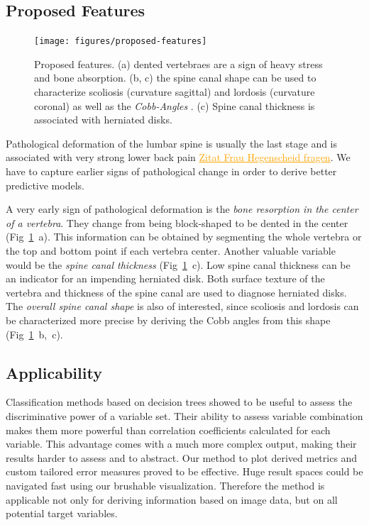 \documentclass[a4paper,twoside]{style/article}
\newcommand{\com}[1]{\textcolor{orange}{\uline{#1}}}
\begin{document}
\subsection{Proposed Features}
\label{sec:ProposedFeatures}
\begin{figure}[!h]
  \centering
  \texttt{[image: figures/proposed-features]}
  \caption{
	Proposed features.
	(a) dented vertebraes are a sign of heavy stress and bone absorption.
	(b, c) the spine canal shape can be used to characterize scoliosis (curvature sagittal) and lordosis (curvature coronal) as well as the \emph{Cobb-Angles} \cite{Cobb}.
	(c) Spine canal thickness is associated with herniated disks.
	}
  \label{fig:proposedFeatures}
\end{figure}
\noindent Pathological deformation of the lumbar spine is usually the last stage and is associated with very strong lower back pain \com{Zitat Frau Hegenscheid fragen}.
We have to capture earlier signs of pathological change in order to derive better predictive models.

A very early sign of pathological deformation is the \emph{bone resorption in the center of a vertebra}.
They change from being block-shaped to be dented in the center (Fig~\ref{fig:proposedFeatures}~a).
This information can be obtained by segmenting the whole vertebra or the top and bottom point if each vertebra center.
Another valuable variable would be the \emph{spine canal thickness} (Fig~\ref{fig:proposedFeatures}~c).
Low spine canal thickness can be an indicator for an impending herniated disk.
Both surface texture of the vertebra and thickness of the spine canal are used to diagnose herniated disks.
The \emph{overall spine canal shape} is also of interested, since scoliosis and lordosis can be characterized more precise by deriving the Cobb angles from this shape (Fig~\ref{fig:proposedFeatures}~b,~c).
\subsection{Applicability}
Classification methods based on decision trees showed to be useful to assess the discriminative power of a variable set.
Their ability to assess variable combination makes them more powerful than correlation coefficients calculated for each variable.
This advantage comes with a much more complex output, making their results harder to assess and to abstract.
Our method to plot derived metrics and custom tailored error measures proved to be effective.
Huge result spaces could be navigated fast using our brushable visualization.
Therefore the method is applicable not only for deriving information based on image data, but on all potential target variables.
\end{document}
